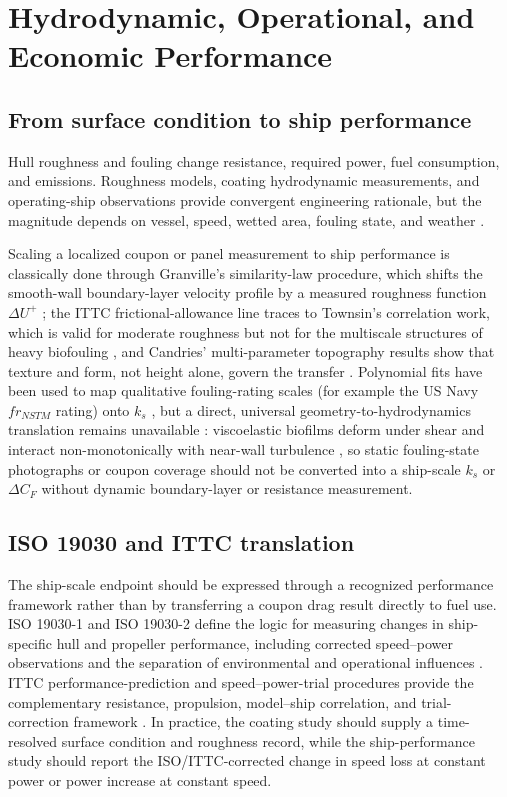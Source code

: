 \section{Hydrodynamic, Operational, and Economic Performance}
\subsection{From surface condition to ship performance}
Hull roughness and fouling change resistance, required power, fuel consumption, and emissions. Roughness models, coating hydrodynamic measurements, and operating-ship observations provide convergent engineering rationale, but the magnitude depends on vessel, speed, wetted area, fouling state, and weather \cite{speranza_modelling_2019,yeginbayeva_experimental_2018,wang_drag_2018,hakim_investigation_2019}.

Scaling a localized coupon or panel measurement to ship performance is classically done through Granville's similarity-law procedure, which shifts the smooth-wall boundary-layer velocity profile by a measured roughness function $\Delta U^+$ \cite{granville_1958,granville_1987}; the ITTC frictional-allowance line traces to Townsin's correlation work, which is valid for moderate roughness but not for the multiscale structures of heavy biofouling \cite{townsin_mosaad_1985,townsin_2003}, and Candries' multi-parameter topography results show that texture and form, not height alone, govern the transfer \cite{candries_2001_thesis,candries_atlar_2005}. Polynomial fits have been used to map qualitative fouling-rating scales (for example the US Navy $fr_{NSTM}$ rating) onto $k_s$ \cite{schultz2007roughness}, but a direct, universal geometry-to-hydrodynamics translation remains unavailable \cite{speranza_modelling_2019}: viscoelastic biofilms deform under shear and interact non-monotonically with near-wall turbulence \cite{snowdon_surface_2023}, so static fouling-state photographs or coupon coverage should not be converted into a ship-scale $k_s$ or $\Delta C_F$ without dynamic boundary-layer or resistance measurement.

\subsection{ISO 19030 and ITTC translation}
The ship-scale endpoint should be expressed through a recognized performance framework rather than by transferring a coupon drag result directly to fuel use. ISO 19030-1 and ISO 19030-2 define the logic for measuring changes in ship-specific hull and propeller performance, including corrected speed--power observations and the separation of environmental and operational influences \cite{iso19030_1_2016,iso19030_2_2016}. ITTC performance-prediction and speed--power-trial procedures provide the complementary resistance, propulsion, model--ship correlation, and trial-correction framework \cite{ittc_speed_power}. In practice, the coating study should supply a time-resolved surface condition and roughness record, while the ship-performance study should report the ISO/ITTC-corrected change in speed loss at constant power or power increase at constant speed.

